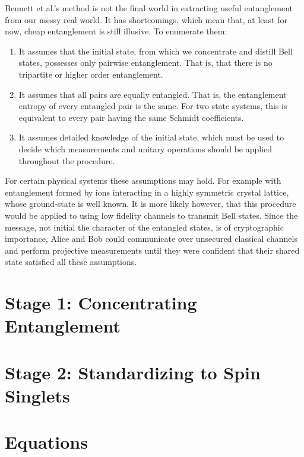 \documentclass[12pt,letterpaper]{article}
\begin{document}
Bennett et al.'s method is not the final world in extracting useful entanglement from our messy real world.
It has shortcomings, which mean that, at least for now, cheap entanglement is still illusive. To enumerate them:
\begin{enumerate}
	\item It assumes that the initial state, from which we concentrate and distill Bell states, possesses only pairwise entanglement. That is, that there is no tripartite or higher order entanglement.
	\item It assumes that all pairs are equally entangled. That is, the entanglement entropy of every entangled pair is the same. For two state systems, this is equivalent to every pair having the same Schmidt coefficients.
	\item It assumes detailed knowledge of the initial state, which must be used to decide which measurements and unitary operations should be applied throughout the procedure. 
\end{enumerate}

For certain physical systems these assumptions may hold. 
For example with entanglement formed by ions interacting in a highly symmetric crystal lattice, whose ground-state is well known.
It is more likely however, that this procedure would be applied to using low fidelity channels to transmit Bell states.
Since the message, not initial the character of the entangled states, is of cryptographic importance, Alice and Bob could communicate over unsecured classical channels and perform projective measurements until they were confident that their shared state satisfied all these assumptions.

\section{Stage 1: Concentrating Entanglement}
\section{Stage 2: Standardizing to Spin Singlets}

\section{Equations}

\printbibliography
\end{document}
